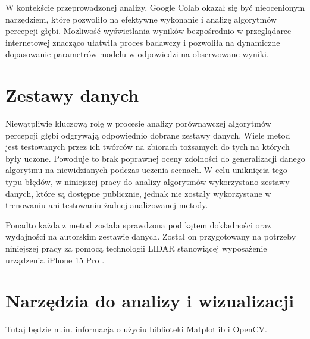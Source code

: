 W kontekście przeprowadzonej analizy, Google Colab okazał się być nieocenionym narzędziem, które pozwoliło na efektywne wykonanie i analizę algorytmów percepcji głębi. Możliwość wyświetlania wyników bezpośrednio w przeglądarce internetowej znacząco ułatwiła proces badawczy i pozwoliła na dynamiczne dopasowanie parametrów modelu w odpowiedzi na obserwowane wyniki.

\section{Zestawy danych}
Niewątpliwie kluczową rolę w procesie analizy porównawczej algorytmów percepcji głębi odgrywają odpowiednio dobrane zestawy danych. Wiele metod jest testowanych przez ich twórców na zbiorach tożsamych do tych na których były uczone. Powoduje to brak poprawnej oceny zdolności do generalizacji danego algorytmu na niewidzianych podczas uczenia scenach. W celu uniknięcia tego typu błędów, w niniejszej pracy do analizy algorytmów wykorzystano zestawy danych, które są dostępne publicznie, jednak nie zostały wykorzystane w trenowaniu ani testowaniu żadnej analizowanej metody.

Ponadto każda z metod została sprawdzona pod kątem dokładności oraz wydajności na autorskim zestawie danych. Został on przygotowany na potrzeby niniejszej pracy za pomocą technologii LIDAR stanowiącej wyposażenie urządzenia iPhone 15 Pro \cite{chase2022apple}.

\section{Narzędzia do analizy i wizualizacji}
Tutaj będzie m.in. informacja o użyciu biblioteki Matplotlib i OpenCV.
